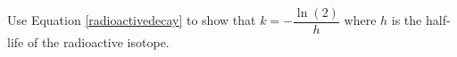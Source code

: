 {Use Equation \ref{radioactivedecay} to show that $k = -\dfrac{\ln(2)}{h}$ where $h$ is the half-life of the radioactive isotope.}
{}